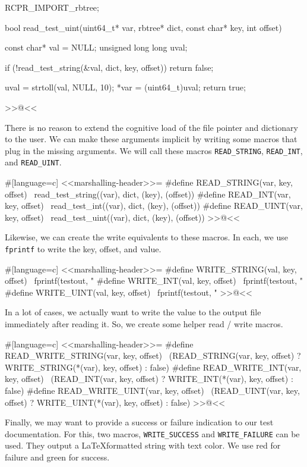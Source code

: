 {RCPR_IMPORT_rbtree;

bool read_test_uint(uint64_t* var, rbtree* dict, const char* key, int offset)
{
    const char* val = NULL;
    unsigned long long uval;

    if (!read_test_string(&val, dict, key, offset))
    {
        return false;
    }

    uval = strtoll(val, NULL, 10);
    *var = (uint64_t)uval;
    return true;
}
>>@<<

There is no reason to extend the cognitive load of the file pointer and
dictionary to the user. We can make these arguments implicit by writing some
macros that plug in the missing arguments. We will call these macros
\verb/READ_STRING/, \verb/READ_INT/, and \verb/READ_UINT/.

#[language=c]
<<marshalling-header>>=
#define READ_STRING(var, key, offset) \
    read_test_string((var), dict, (key), (offset))
#define READ_INT(var, key, offset) \
    read_test_int((var), dict, (key), (offset))
#define READ_UINT(var, key, offset) \
    read_test_uint((var), dict, (key), (offset))
>>@<<

Likewise, we can create the write equivalents to these macros. In each, we use
\verb/fprintf/ to write the key, offset, and value.

#[language=c]
<<marshalling-header>>=
#define WRITE_STRING(val, key, offset) \
    fprintf(testout, "%
#define WRITE_INT(val, key, offset) \
    fprintf(testout, "%
#define WRITE_UINT(val, key, offset) \
    fprintf(testout, "%
>>@<<

In a lot of cases, we actually want to write the value to the output file
immediately after reading it.  So, we create some helper read / write macros.

#[language=c]
<<marshalling-header>>=
#define READ_WRITE_STRING(var, key, offset) \
    (READ_STRING(var, key, offset) ? WRITE_STRING(*(var), key, offset) : false)
#define READ_WRITE_INT(var, key, offset) \
    (READ_INT(var, key, offset) ? WRITE_INT(*(var), key, offset) : false)
#define READ_WRITE_UINT(var, key, offset) \
    (READ_UINT(var, key, offset) ? WRITE_UINT(*(var), key, offset) : false)
>>@<<

Finally, we may want to provide a success or failure indication to our test
documentation. For this, two macros, \verb/WRITE_SUCCESS/ and
\verb/WRITE_FAILURE/ can be used. They output a \LaTeX formatted string with
text color.  We use red for failure and green for success.

}
